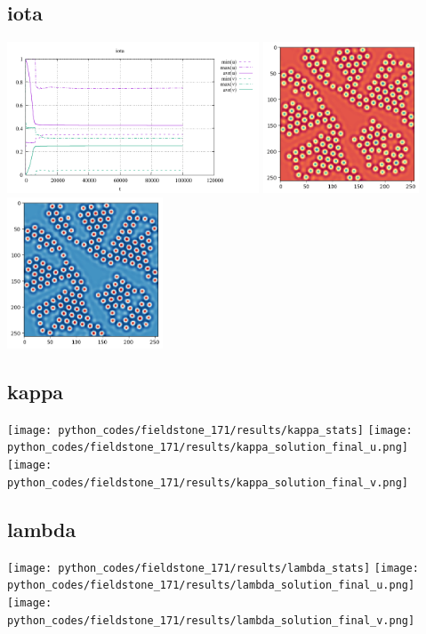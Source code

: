 \subsection*{iota}
\begin{center}
\includegraphics[height=4.5cm]{python_codes/fieldstone_171/results/iota_stats}
\includegraphics[height=4.5cm]{python_codes/fieldstone_171/results/iota_solution_final_u.png}
\includegraphics[height=4.5cm]{python_codes/fieldstone_171/results/iota_solution_final_v.png}
\end{center}

\subsection*{kappa}
\begin{center}
\texttt{[image: python\_codes/fieldstone\_171/results/kappa\_stats]}
\texttt{[image: python\_codes/fieldstone\_171/results/kappa\_solution\_final\_u.png]}
\texttt{[image: python\_codes/fieldstone\_171/results/kappa\_solution\_final\_v.png]}
\end{center}

\subsection*{lambda}
\begin{center}
\texttt{[image: python\_codes/fieldstone\_171/results/lambda\_stats]}
\texttt{[image: python\_codes/fieldstone\_171/results/lambda\_solution\_final\_u.png]}
\texttt{[image: python\_codes/fieldstone\_171/results/lambda\_solution\_final\_v.png]}
\end{center}

